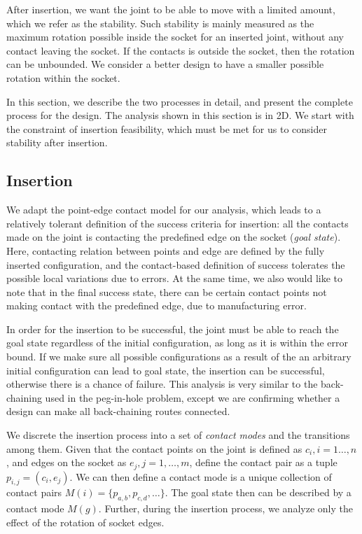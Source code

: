\documentclass[letterpaper, 10 pt, conference]{ieeeconf}
\begin{document}
After insertion, we want the joint to be able to move with a limited amount, which we refer as the stability. Such stability is mainly measured as the maximum rotation possible inside the socket for an inserted joint, without any contact leaving the socket. If the contacts is outside the socket, then the rotation can be unbounded. We consider a better design to have a smaller possible rotation within the socket. 

In this section, we describe the two processes in detail, and present the complete process for the design. The analysis shown in this section is in 2D. We start with the constraint of insertion feasibility, which must be met for us to consider stability after insertion. 

\subsection{Insertion}

We adapt the point-edge contact model for our analysis, which leads to a relatively tolerant definition of the success criteria for insertion: all the contacts made on the joint is contacting the predefined edge on the socket ({\em goal state}). Here, contacting relation between points and edge are defined by the fully inserted configuration, and the contact-based definition of success tolerates the possible local variations due to errors. At the same time, we also would like to note that in the final success state, there can be certain contact points not making contact with the predefined edge, due to manufacturing error. 

In order for the insertion to be successful, the joint must be able to reach the goal state regardless of the initial configuration, as long as it is within the error bound. If we make sure all possible configurations as a result of the an arbitrary initial configuration can lead to goal state, the insertion can be successful, otherwise there is a chance of failure. This analysis is very similar to the back-chaining used in the peg-in-hole problem, except we are confirming whether a design can make all back-chaining routes connected. 

We discrete the insertion process into a set of {\em contact modes} and the transitions among them. Given that the contact points on the joint is defined as $c_i, i=1\ldots, n$, and edges on the socket as $e_j, j=1,\ldots, m$, define the contact pair as a tuple $p_{i, j} = (c_i, e_j)$. We can then define a contact mode is a unique collection of contact pairs $M(i) = \{p_{a, b}, p_{c, d}, \ldots\}$. The goal state then can be described by a contact mode $M(g)$. Further, during the insertion process, we analyze only the effect of the rotation of socket edges. 
\end{document}
